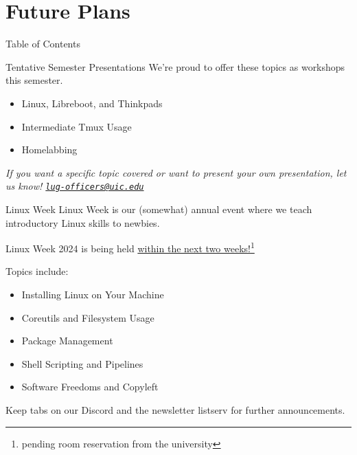 \documentclass{beamer}
\begin{document}
\section{Future Plans}
\begin{frame}{Table of Contents}
	\tableofcontents[currentsection]
\end{frame}

\begin{frame}{Tentative Semester Presentations}
	We're proud to offer these topics as workshops this semester.
	\pause
	\begin{itemize}
		\item Linux, Libreboot, and Thinkpads
		\item Intermediate Tmux Usage
		\item Homelabbing
	\end{itemize}
	\pause
	\textit{If you want a specific topic covered or want to present your
	own presentation, let us know!
	\href{mailto:lug-officers@uic.edu}{\texttt{lug-officers@uic.edu}}}
\end{frame}

\begin{frame}{Linux Week}
	Linux Week is our (somewhat) annual event where we teach introductory
	Linux skills to newbies.
	\pause

	Linux Week 2024 is being held \underline{within the next two
	weeks!}\footnote{pending room reservation from the university}
	\pause
	
	Topics include:
	\begin{itemize}
		\item Installing Linux on Your Machine
		\item Coreutils and Filesystem Usage
		\item Package Management
		\item Shell Scripting and Pipelines
		\item Software Freedoms and Copyleft
	\end{itemize}
	\pause

	Keep tabs on our Discord and the newsletter listserv for further
	announcements.
\end{frame}
\end{document}
